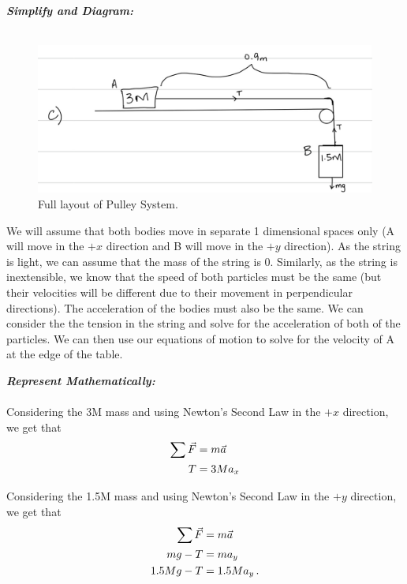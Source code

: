 \begin{subquestions}
	
	
	
	\textbf{\textit{Simplify and Diagram:}} \\ \\
	\begin{figure}[H]
		\begin{center}
			\includegraphics[scale=0.25]{../2015/figures/2015q6-3}
			\caption{\label{2015:q66:fig:Diagram3} Full layout of Pulley System.}
		\end{center}
	\end{figure}
	We will assume that both bodies move in separate 1 dimensional spaces only (A will move in the $+x$ direction and B will move in the $+y$ direction). As the string is light, we can assume that the mass of the string is 0. Similarly, as the string is inextensible, we know that the speed of both particles must be the same (but their velocities will be different due to their movement in perpendicular directions). The acceleration of the bodies must also be the same. We can consider the the tension in the string and solve for the acceleration of both of the particles. We can then use our equations of motion to solve for the velocity of A at the edge of the table.
	
	
	
	
	\textbf{\textit{Represent Mathematically:}} \\ \\
	Considering the 3M mass and using Newton's Second Law in the $+x$ direction, we get that
	\begin{align}
		\sum \vec{F} & = m\vec{a} \nonumber \\
		T & = 3Ma_x \nonumber \\ \label{2015:q66:6b1}
	\end{align}
	
	Considering the 1.5M mass and using Newton's Second Law in the $+y$ direction, we get that
	\begin{align}
		\sum \vec{F} & = m\vec{a} \nonumber \\
		mg-T & = ma_y \nonumber \\
		1.5Mg - T & = 1.5Ma_y \,. \label{2015:q66:6b2}
	\end{align}
	

\end{subquestions}

